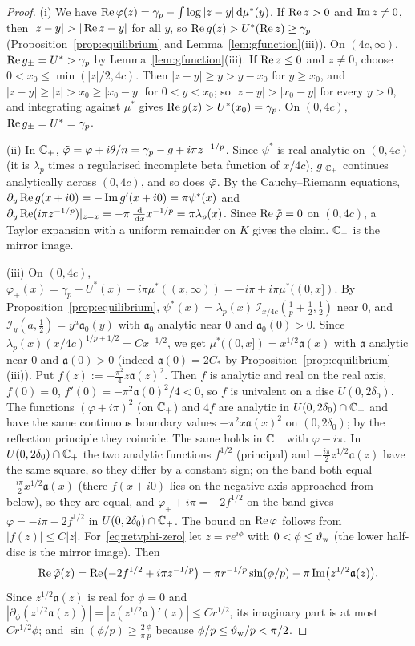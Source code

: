 \begin{proof}
(i) We have $\operatorname{Re}\varphi(z)=\gamma_p-\int\log|z-y|\,\mathrm{d}\mu^*(y)$. If $\operatorname{Re} z>0$ and $\operatorname{Im} z\ne0$, then
$|z-y|>|\re z-y|$ for all $y$, so $\operatorname{Re} g(z)>U^*(\operatorname{Re} z)\ge\gamma_p$ (Proposition~\ref{prop:equilibrium} and
Lemma~\ref{lem:gfunction}(iii)). On $(4c,\infty)$, $\operatorname{Re} g_\pm=U^*>\gamma_p$ by Lemma~\ref{lem:gfunction}(iii). If
$\operatorname{Re} z\le0$ and $z\ne0$, choose $0<x_0\le\min(|z|/2,4c)$. Then $|z-y|\ge y>y-x_0$ for $y\ge x_0$, and
$|z-y|\ge|z|>x_0\ge|x_0-y|$ for $0<y<x_0$; so $|z-y|>|x_0-y|$ for every $y>0$, and integrating against $\mu^*$ gives
$\operatorname{Re} g(z)>U^*(x_0)=\gamma_p$. On $(0,4c)$, $\operatorname{Re} g_\pm=U^*=\gamma_p$.

(ii) In $\mathbb{C}_+$, $\tilde\varphi=\varphi+i\theta/n=\gamma_p-g+i\pi z^{-1/p}$. Since $\psi^*$ is real-analytic on $(0,4c)$ (it is
$\lambda_p$ times a regularised incomplete beta function of $x/4c$), $g|_{\mathbb{C}_+}$ continues analytically across
$(0,4c)$, and so does $\tilde\varphi$. By the Cauchy--Riemann equations, $\partial_y\operatorname{Re} g(x+i0)=-\operatorname{Im} g'(x+i0)=\pi\psi^*(x)$
and $\partial_y\operatorname{Re}(i\pi z^{-1/p})|_{z=x}=-\pi\,\frac{\,\mathrm{d}}{\,\mathrm{d} x}x^{-1/p}=\pi\lambda_p(x)$. Since $\operatorname{Re}\tilde\varphi=0$ on
$(0,4c)$, a Taylor expansion with a uniform remainder on $K$ gives the claim. $\mathbb{C}_-$ is the mirror image.

(iii) On $(0,4c)$, $\varphi_+(x)=\gamma_p-U^*(x)-i\pi\mu^*((x,\infty))=-i\pi+i\pi\mu^*((0,x])$. By
Proposition~\ref{prop:equilibrium}, $\psi^*(x)=\lambda_p(x)\,\mathcal I_{x/4c}(\frac1p+\frac12,\frac12)$ near $0$,
and $\mathcal I_y(a,\frac12)=y^a\mathfrak a_0(y)$ with $\mathfrak a_0$ analytic near $0$ and $\mathfrak a_0(0)>0$. Since
$\lambda_p(x)(x/4c)^{1/p+1/2}=Cx^{-1/2}$, we get $\mu^*((0,x])=x^{1/2}\mathfrak a(x)$ with $\mathfrak a$ analytic near
$0$ and $\mathfrak a(0)>0$ (indeed $\mathfrak a(0)=2C_*$ by Proposition~\ref{prop:equilibrium}(iii)). Put $f(z):=-\frac{\pi^2}{4}z\mathfrak a(z)^2$. Then $f$ is analytic and real on the real
axis, $f(0)=0$, $f'(0)=-\pi^2\mathfrak a(0)^2/4<0$, so $f$ is univalent on a disc $U(0,2\delta_0)$. The functions
$(\varphi+i\pi)^2$ (on $\mathbb{C}_+$) and $4f$ are analytic in $U(0,2\delta_0)\cap\mathbb{C}_+$ and have the same continuous boundary
values $-\pi^2x\mathfrak a(x)^2$ on $(0,2\delta_0)$; by the reflection principle they coincide. The same holds in $\mathbb{C}_-$
with $\varphi-i\pi$. In $U(0,2\delta_0)\cap\mathbb{C}_+$ the two analytic functions $f^{1/2}$ (principal) and
$-\frac{i\pi}2z^{1/2}\mathfrak a(z)$ have the same square, so they differ by a constant sign; on the band both equal
$-\frac{i\pi}2x^{1/2}\mathfrak a(x)$ (there $f(x+i0)$ lies on the negative axis approached from below), so they are
equal, and $\varphi_++i\pi=-2f^{1/2}$ on the band gives $\varphi=-i\pi-2f^{1/2}$ in $U(0,2\delta_0)\cap\mathbb{C}_+$. The bound
on $\operatorname{Re}\varphi$ follows from $|f(z)|\le C|z|$. For~\eqref{eq:retvphi-zero} let $z=re^{i\phi}$ with
$0<\phi\le\vartheta_{\mathrm{w}}$ (the lower half-disc is the mirror image). Then
\[
  \operatorname{Re}\tilde\varphi(z)=\operatorname{Re}\bigl(-2f^{1/2}+i\pi z^{-1/p}\bigr)=\pi r^{-1/p}\sin(\phi/p)-\pi\operatorname{Im}\bigl(z^{1/2}\mathfrak a(z)\bigr).
\]
Since $z^{1/2}\mathfrak a(z)$ is real for $\phi=0$ and $|\partial_\phi(z^{1/2}\mathfrak a(z))|=|z(z^{1/2}\mathfrak
a)'(z)|\le Cr^{1/2}$, its imaginary part is at most $Cr^{1/2}\phi$; and $\sin(\phi/p)\ge\frac2\pi\frac\phi p$
because $\phi/p\le\vartheta_{\mathrm{w}}/p<\pi/2$.


\end{proof}
